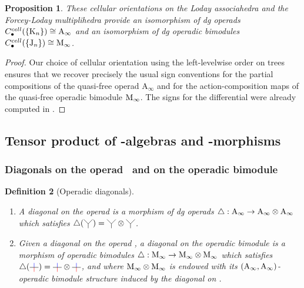 \documentclass[twoside, 12pt]{amsart}
\newtheorem{definition}{Definition}[section]
\newtheorem{proposition}[definition]{Proposition}
\theoremstyle{remark}
\begin{document}
\begin{proposition} 
\label{prop:cellular-chains}
These cellular orientations on the Loday associahedra and the Forcey-Loday multiplihedra provide an isomorphism of dg operads $C_\bullet^{cell}(\{\mathrm{K}_n\})\cong \mathrm{A}_\infty$ and an isomorphism of dg operadic bimodules $C_\bullet^{cell}(\{\mathrm{J}_n\})\cong \mathrm{M}_\infty$. 
\end{proposition}

\begin{proof}
Our choice of cellular orientation using the left-levelwise order on trees ensures that we recover precisely the usual sign conventions for the partial compositions of the quasi-free operad $\mathrm{A}_\infty$ and for the action-composition maps of the quasi-free operadic bimodule $\mathrm{M}_\infty$. 
The signs for the differential were already computed in \cite[I, Section 1.4]{Mazuir21}.
\end{proof}

\subsection{Tensor product of \Ainf -algebras and \Ainf -morphisms}

\subsubsection{Diagonals on the operad \Ainf\ and on the operadic bimodule \Minf}

\begin{definition}[Operadic diagonals]
\begin{enumerate}[leftmargin=*]
    \item A \emph{diagonal on the operad \Ainf} is a morphism of dg operads $\triangle : \mathrm{A}_\infty \rightarrow \mathrm{A}_\infty \otimes \mathrm{A}_\infty$ which satisfies $\triangle (\arbreopdeux) = \arbreopdeux \otimes \arbreopdeux$. 
    \item Given a diagonal on the operad \Ainf, a \emph{diagonal on the operadic bimodule \Minf} is a morphism of operadic bimodules $\triangle : \mathrm{M}_\infty \rightarrow \mathrm{M}_\infty \otimes \mathrm{M}_\infty$ which satisfies $\triangle ( \arbreopunmorph ) = \arbreopunmorph \otimes \arbreopunmorph$, and where $\mathrm{M}_\infty \otimes \mathrm{M}_\infty$ is endowed with its $(\mathrm{A}_\infty , \mathrm{A}_\infty)$-operadic bimodule structure induced by the diagonal on \Ainf .
\end{enumerate}
\end{definition}
\end{document}
